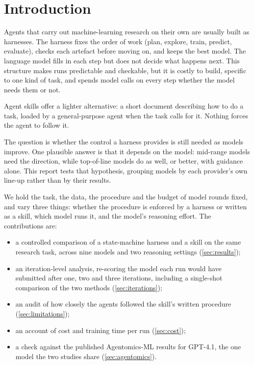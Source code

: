 \section{Introduction}\label{sec:intro}

Agents that carry out machine-learning research on their own are usually built as harnesses. The harness fixes the
order of work (plan, explore, train, predict, evaluate), checks each artefact before moving on, and keeps the best
model. The language model fills in each step but does not decide what happens next. This structure makes runs
predictable and checkable, but it is costly to build, specific to one kind of task, and spends model calls on every
step whether the model needs them or not.

Agent skills offer a lighter alternative: a short document describing how to do a task, loaded by a general-purpose agent when the task calls for it. Nothing forces the agent to follow it.

The question is whether the control a harness provides is still needed as models improve. One plausible answer is that
it depends on the model: mid-range models need the direction, while top-of-line models do as well, or better, with
guidance alone. This report tests that hypothesis, grouping models by each provider's own line-up rather than by
their results.

We hold the task, the data, the procedure and the budget of model rounds fixed, and vary three things: whether the procedure is
enforced by a harness or written as a skill, which model runs it, and the model's reasoning effort. The contributions
are:
\begin{itemize}
\item a controlled comparison of a state-machine harness and a skill on the same research task, across nine models
  and two reasoning settings (\cref{sec:results});
\item an iteration-level analysis, re-scoring the model each run would have submitted after one, two and three
  iterations, including a single-shot comparison of the two methods (\cref{sec:iterations});
\item an audit of how closely the agents followed the skill's written procedure (\cref{sec:limitations});
\item an account of cost and training time per run (\cref{sec:cost});
\item a check against the published Agentomics-ML results for GPT-4.1, the one model the two studies share
  (\cref{sec:agentomics}).
\end{itemize}
